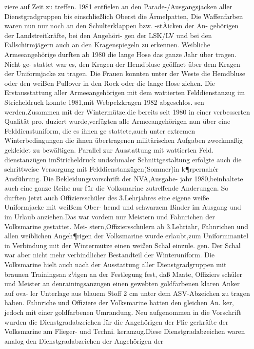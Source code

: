 ziere auf Zeit zu treffen.
1981 entfielen an den Parade-/Ausgangsjacken
aller Dienstgradgruppen bis einschließlich Oberst
die Ãrmelpatten, Die Waffenfarben waren nun nur
noch an den Schulterklappen bzw. -stÃicken der An-
gehörigen der Landstreitkräfte, bei den Angehöri-
gen der LSK/LV und bei den Fallschirmjägern
auch an den Kragenspiegeln zu erkennen.
Weibliche Armeeangehörige durften ab 1980 die
lange Hose das ganze Jahr über tragen. Nicht ge-
stattet war es, den Kragen der Hemdbluse geöffnet
über dem Kragen der Uniformjacke zu tragen. Die
Frauen konnten unter der Weste die Hemdbluse
oder den weiBen Pullover in den Rock oder die
lange Hose ziehen.
Die Erstausstattung aller Armeeangehörigen mit
dem wattierten Felddienstanzug im Stricheldruck konnte 1981,mit Webpelzkragen 1982 abgeschlos.
sen werden.Zusammen mit der Wintermütze.die
bereits seit 1980 in einer verbesserten Qualität pro.
duziert wurde,verfügten alle Armeeangehörigen
nun über eine Felddienstuniform, die es ihnen ge
stattete,auch unter extremen Winterbedingungen
die ihnen übertragenen militärischen Aufgaben
zweckmaßig gekleidet zu bewältigen.
Parallel zur Ausstattung mit wattierten Feld.
dienstanzügen imStricheldruck undschmaler
Schnittgestaltung erfolgte auch die schrittweise
Versorgung mit Felddienstanzügen(Sommer)in
k¶rpernahér Ausführung.
Die Bekleidungsvorschrift der NVA,Ausgabe-
jahr 1980,beinhaltete auch eine ganze Reihe nur
für die Volksmarine zutreffende Anderungen. So
durften jetzt auch Offiziersschüler des 3.Lehrjahres
eine eigene weiße Uniformjacke mit weiBem Ober-
hemd und schwarzem Binder im Ausgang und im
Urlaub anziehen.Das war vordem nur Meistern
und Fahnrichen der Volksmarine gestattet. Mei-
stern,Offiziersschülern ab 3.Lehriahr, Fahnrichen
und allen weiblichen Angeh¶rigen der Volksmarine
wurde erlaubt,zum Uniformmantel in Verbindung
mit der Wintermütze einen weißen Schal einzule.
gen. Der Schal war aber nicht mehr verbindlicher
Bestandteil der Winteruniform.
Die Volksmarine hielt auch nach der Ausstattung
aller Dienstgradgruppen mit braunen Trainingsan
z¼gen an der Festlegung fest, daß Maate, Offiziers
schüler und Meister an denrainingsanzugen
einen gewebten goldfarbenen klaren Anker auf ova-
ler Unterlage aus blauem Stoff 2 cm unter dem
ASV-Abzeichen zu tragen haben. Fahnriche und
Offiziere der Volksmarine hatten den gleichen An.
ker, jedoch mit einer goldfarbenen Umrandung.
Neu aufgenommen in die Vorschrift wurden die
Dienstgradabzeichen für die Angehörigen der Flie
gerkräfte der Volksmarine am Flieger- und Techni.
keranzug.Diese Dienstgradabzeichen waren analog
den Dienstgradabzeichen der Angehörigen der
